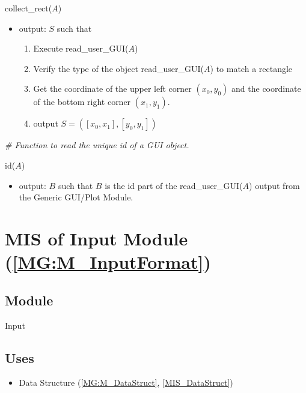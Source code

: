 \documentclass[12pt, titlepage]{article}
\begin{document}
\noindent collect{\_}rect($A$)
\begin{itemize}
\item output: $S$ such that
	\begin{enumerate}
	\item Execute read{\_}user{\_}GUI($A$)
	\item Verify the type of the object read{\_}user{\_}GUI($A$) to match a 
rectangle
	\item Get the coordinate of the upper left corner $(x_0,y_0)$ and the 
coordinate of the bottom right corner $(x_1,y_1)$. 
	\item output $S=([x_0,x_1],[y_0,y_1])$
	\end{enumerate} 
\end{itemize}
\bigskip

\noindent\textit{{\#} Function to read the unique id of a GUI object.} \medskip

\noindent id($A$)
\begin{itemize}
\item output: $B$ such that $B$ is the id part of the read{\_}user{\_}GUI($A$) 
output from the Generic GUI/Plot Module.
\end{itemize}
\bigskip

\section{MIS of Input Module (\texorpdfstring{\cref{MG:M_InputFormat}}))} 
\label{MIS_Input}


\subsection{Module}
Input
\subsection{Uses}
\begin{itemize}
\item Data Structure (\cref{MG:M_DataStruct}, \cref{MIS_DataStruct})
\end{itemize}
\end{document}

